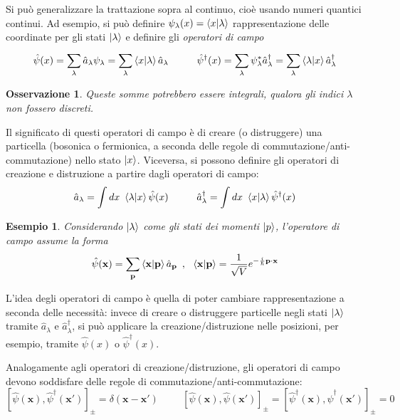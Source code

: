 \documentclass[11pt, a4paper]{scrartcl}
\theoremstyle{style}
\newtheorem{esempio}{Esempio}[section]
\newtheorem{osservazione}{Osservazione}[section]
\theoremstyle{style1}
\numberwithin{equation}{subsection}
\begin{document}
Si pu\`o generalizzare la trattazione sopra al continuo, cio\`e usando numeri quantici continui. 
Ad esempio, si pu\`o definire $\psi _\lambda (x) = \braket{x|\lambda } $ rappresentazione delle coordinate per gli stati $\ket{\lambda } $ e definire gli \textit{operatori di campo} 
\[
\hat{\psi }(x) = \sum_{\lambda }^{} \hat{a}_\lambda \psi _\lambda  = \sum_{\lambda }^{} \braket{x|\lambda } \hat{a}_\lambda  \hspace{1cm}\hat{\psi }^\dagger (x) = \sum_{\lambda }^{}\psi _\lambda ^* \hat{a}^\dagger _\lambda = \sum_{\lambda }^{} \braket{\lambda |x} \hat{a}^\dagger _\lambda 
\] 
\begin{osservazione}
Queste somme potrebbero essere integrali, qualora gli indici $\lambda $ non fossero discreti.
\end{osservazione}
\noindent Il significato di questi operatori di campo \`e di creare (o distruggere) una particella (bosonica o fermionica, a seconda delle regole di commutazione/anti-commutazione) nello stato $\ket{x} $.
Viceversa, si possono definire gli operatori di creazione e distruzione a partire dagli operatori di campo:
\[
\hat{a}_\lambda  = \int  dx  \ \braket{\lambda |x}  \hat{\psi }(x) \hspace{1cm} \hat{a}_\lambda^\dagger = \int dx\ \braket{x|\lambda } \hat{\psi }^\dagger (x)
\] 
\begin{esempio}
Considerando $\ket{\lambda } $ come gli stati dei momenti $\ket{p} $, l'operatore di campo assume la forma
\[
\hat{\psi }(\mathbf{x} ) = \sum_{\mathbf{p} }^{} \braket{\mathbf{x} |\mathbf{p} } \hat{a}_\mathbf{p} \ \, , \ \ \braket{\mathbf{x} |\mathbf{p} } = \frac{1}{\sqrt{V} }e^{-\frac{i}{\hbar }\mathbf{p} \cdot \mathbf{x} }
\] 
\end{esempio}
\noindent L'idea degli operatori di campo \`e quella di poter cambiare rappresentazione a seconda delle necessit\`a: invece di creare o distruggere particelle negli stati $\ket{\lambda } $ tramite $\hat{a}_\lambda $ e $\hat{a}^\dagger _\lambda $, si pu\`o applicare la creazione/distruzione nelle posizioni, per esempio, tramite $\hat{\psi}  (x)$ o $\hat{\psi} ^\dagger  (x)$.

Analogamente agli operatori di creazione/distruzione, gli operatori di campo devono soddisfare delle regole di commutazione/anti-commutazione:
\[
	[\hat{\psi }(\mathbf{x} ) , \hat{\psi }^\dagger (\mathbf{x}' ) ] _{\pm} = \delta (\mathbf{x} -\mathbf{x} ')\hspace{1cm} [ \hat{\psi }(\mathbf{x} ) , \hat{\psi }(\mathbf{x} ')]_\pm = [ \hat{\psi }^\dagger (\mathbf{x} ) , \hat{\psi }^\dagger (\mathbf{x} ')]_\pm = 0
\] 
\end{document}
